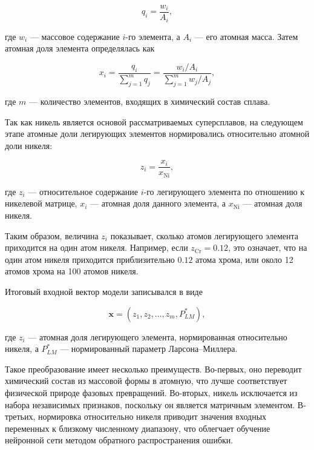 \begin{equation}
q_i = \frac{w_i}{A_i},
\end{equation}

где $w_i$ --- массовое содержание $i$-го элемента, 
а $A_i$ --- его атомная масса. Затем атомная доля элемента 
определялась как

\begin{equation}
x_i =
\frac{q_i}
{\sum\limits_{j=1}^{m} q_j}
=
\frac{w_i/A_i}
{\sum\limits_{j=1}^{m} w_j/A_j},
\end{equation}

где $m$ --- количество элементов, входящих в химический состав сплава.

Так как никель является основой рассматриваемых суперсплавов, 
на следующем этапе атомные доли легирующих элементов нормировались 
относительно атомной доли никеля:

\begin{equation}
z_i =
\frac{x_i}{x_{\mathrm{Ni}}},
\end{equation}

где $z_i$ --- относительное содержание $i$-го легирующего элемента по 
отношению к никелевой матрице, $x_i$ --- атомная доля данного элемента, 
а $x_{\mathrm{Ni}}$ --- атомная доля никеля.

Таким образом, величина $z_i$ показывает, сколько атомов легирующего 
элемента приходится на один атом никеля. Например, если $z_{\mathrm{Cr}} = 0.12$, 
это означает, что на один атом никеля приходится приблизительно $0.12$ 
атома хрома, или около 12 атомов хрома на 100 атомов никеля.

Итоговый входной вектор модели записывался в виде

\begin{equation}
\mathbf{x} =
\left(
z_1, z_2, \ldots, z_m, P_{LM}^{*}
\right),
\end{equation}

где $z_i$ --- атомная доля легирующего элемента, нормированная 
относительно никеля, а $P_{LM}^{*}$ --- нормированный параметр 
Ларсона--Миллера.

Такое преобразование имеет несколько преимуществ. 
Во-первых, оно переводит химический состав из массовой формы в атомную, что лучше 
соответствует физической природе фазовых превращений. 
Во-вторых, никель исключается из набора независимых признаков, 
поскольку он является матричным элементом. 
В-третьих, нормировка относительно никеля приводит значения входных 
переменных к близкому численному диапазону, что облегчает 
обучение нейронной сети методом обратного распространения ошибки.


